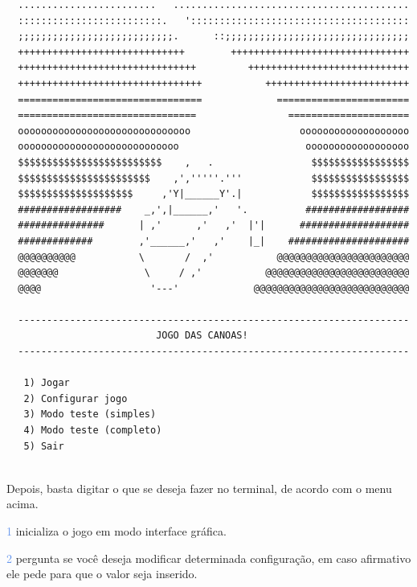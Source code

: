 \documentclass[a4paper,12pt]{article}
\begin{document}
  \begin{verbatim}
  ........................   .........................................
  :::::::::::::::::::::::::.   '::::::::::::::::::::::::::::::::::::::
  ;;;;;;;;;;;;;;;;;;;;;;;;;;;.      ::;;;;;;;;;;;;;;;;;;;;;;;;;;;;;;;;
  +++++++++++++++++++++++++++++        +++++++++++++++++++++++++++++++
  +++++++++++++++++++++++++++++++         ++++++++++++++++++++++++++++
  ++++++++++++++++++++++++++++++++           +++++++++++++++++++++++++
  ================================             =======================
  ===============================                =====================
  oooooooooooooooooooooooooooooo                   ooooooooooooooooooo
  oooooooooooooooooooooooooooo                      oooooooooooooooooo
  $$$$$$$$$$$$$$$$$$$$$$$$$    ,   .                 $$$$$$$$$$$$$$$$$
  $$$$$$$$$$$$$$$$$$$$$$$    ,','''''.'''            $$$$$$$$$$$$$$$$$
  $$$$$$$$$$$$$$$$$$$$     ,'Y|______Y'.|            $$$$$$$$$$$$$$$$$
  ##################    _,',|______,'   '.          ##################
  ###############      | ,'      ,'   ,'  |'|      ###################
  #############        ,'______,'   ,'    |_|    #####################
  @@@@@@@@@@           \       /  ,'           @@@@@@@@@@@@@@@@@@@@@@@
  @@@@@@@               \     / ,'           @@@@@@@@@@@@@@@@@@@@@@@@@
  @@@@                   '---'             @@@@@@@@@@@@@@@@@@@@@@@@@@@

  --------------------------------------------------------------------
                          JOGO DAS CANOAS!                            
  --------------------------------------------------------------------
                                                                      
   1) Jogar                                                           
   2) Configurar jogo                                                 
   3) Modo teste (simples)
   4) Modo teste (completo)
   5) Sair
  
  \end{verbatim}

\newpage %

  Depois, basta digitar o que se deseja fazer no terminal,
  de acordo com o menu acima.
  
  \bigskip

  \textcolor{CornflowerBlue}{1} inicializa o jogo em modo interface gráfica.
  
  \textcolor{CornflowerBlue}{2} pergunta se você deseja modificar determinada 
  configuração,
  em caso afirmativo ele pede para que o valor seja inserido.
  
\end{document}
